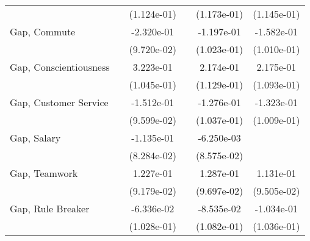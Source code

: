 {\begin{tabular}{l*{5}{c}}
                              &                       & (1.124e-01)           &                       & (1.173e-01)           & (1.145e-01)                 \\
    \addlinespace
    Gap, Commute              &                       & -2.320e-01\sym{++}    &                       & -1.197e-01            & -1.582e-01                  \\
                              &                       & (9.720e-02)           &                       & (1.023e-01)           & (1.010e-01)                 \\
    \addlinespace
    Gap, Conscientiousness    &                       & 3.223e-01\sym{*}      &                       & 2.174e-01\sym{+}      & 2.175e-01\sym{++}           \\
                              &                       & (1.045e-01)           &                       & (1.129e-01)           & (1.093e-01)                 \\
    \addlinespace
    Gap, Customer Service     &                       & -1.512e-01            &                       & -1.276e-01            & -1.323e-01                  \\
                              &                       & (9.599e-02)           &                       & (1.037e-01)           & (1.009e-01)                 \\
    \addlinespace
    Gap, Salary               &                       & -1.135e-01            &                       & -6.250e-03            &                             \\
                              &                       & (8.284e-02)           &                       & (8.575e-02)           &                             \\
    \addlinespace
    Gap, Teamwork             &                       & 1.227e-01             &                       & 1.287e-01             & 1.131e-01                   \\
                              &                       & (9.179e-02)           &                       & (9.697e-02)           & (9.505e-02)                 \\
    \addlinespace
    Gap, Rule Breaker         &                       & -6.336e-02            &                       & -8.535e-02            & -1.034e-01                  \\
                              &                       & (1.028e-01)           &                       & (1.082e-01)           & (1.036e-01)                 \\

\end{tabular}}
